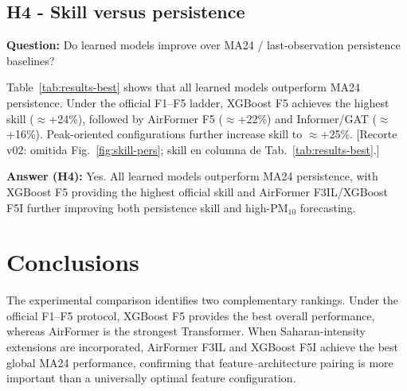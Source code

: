 \documentclass[11pt]{article}
\newcommand{\revnew}[1]{\textcolor{orange!75!black}{#1}}
\begin{document}
\subsection{H4 - Skill versus persistence}
\label{sec:results-h4}

\textbf{Question:} Do learned models improve over MA24 / last-observation persistence baselines?

Table~\ref{tab:results-best} shows that all learned models outperform MA24 persistence. Under the official F1--F5 ladder, XGBoost F5 achieves the highest skill ($\approx$+24\%), followed by AirFormer F5 ($\approx$+22\%) and Informer/GAT ($\approx$+16\%). Peak-oriented configurations further increase skill to $\approx$+25\%. \revnew{[Recorte v02: omitida Fig.~\ref{fig:skill-pers}; skill en columna de Tab.~\ref{tab:results-best}.]}

\textbf{Answer (H4):} Yes. All learned models outperform MA24 persistence, with XGBoost F5 providing the highest official skill and AirFormer F3IL/XGBoost F5I further improving both persistence skill and high-PM$_{10}$ forecasting.

\section{Conclusions}
\label{sec:conclusions}

The experimental comparison identifies two complementary rankings. Under the official F1--F5 protocol, XGBoost F5 provides the best overall performance, whereas AirFormer is the strongest Transformer. When Saharan-intensity extensions are incorporated, AirFormer F3IL and XGBoost F5I achieve the best global MA24 performance, confirming that feature--architecture pairing is more important than a universally optimal feature configuration.
\end{document}
